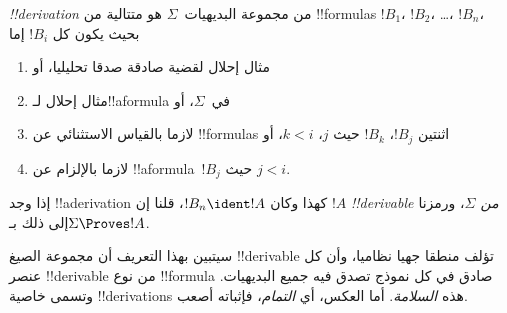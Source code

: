 \documentclass[../../../include/open-logic-section]{subfiles}
\begin{document}
\begin{defn}
\emph{!!{derivation}} من مجموعة البديهيات~$\Sigma$ هو متتالية من
!!{formula}s $!B_1$، $!B_2$، \dots، $!B_n$، بحيث يكون كل $!B_i$ إما
\begin{enumerate}
\item مثال إحلال لقضية صادقة صدقا تحليليا، أو
\item مثال إحلال لـ!!a{formula} في~$\Sigma$، أو
\item لازما بالقياس الاستثنائي عن !!{formula}s اثنتين $!B_j$، $!B_k$
  حيث $j$، $k < i$، أو
\item لازما بالإلزام عن !!a{formula}~$!B_j$ حيث $j < i$.
\end{enumerate}
إذا وجد !!a{derivation} كهذا وكان $!B_n \ident !A$، قلنا إن
$!A$ \emph{!!{derivable} من $\Sigma$}، ورمزنا إلى ذلك بـ$\Sigma \Proves !A$.
\end{defn}

سيتبين بهذا التعريف أن مجموعة الصيغ !!{derivable} تؤلف منطقا جهيا
نظاميا، وأن كل عنصر !!{derivable} من نوع !!{formula} صادق في كل نموذج تصدق فيه
جميع البديهيات. وتسمى خاصية !!{derivation}s هذه \emph{السلامة}. أما
العكس، أي \emph{التمام}، فإثباته أصعب.
\end{document}

